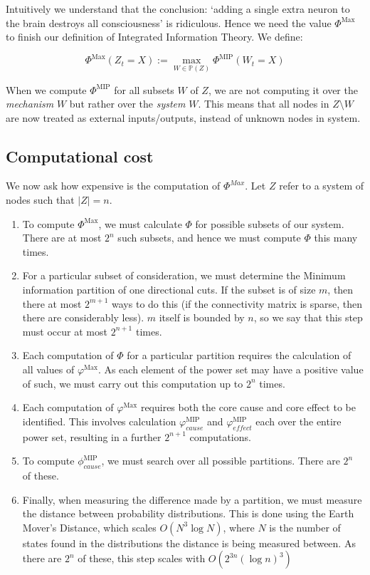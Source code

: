 Intuitively we understand that the conclusion: `adding a single extra neuron to the brain destroys all consciousness' is ridiculous. Hence we need the value $\Phi^{\text{Max}}$ to finish our definition of Integrated Information Theory. We define:

\begin{equation}
\label{def:Phimax}
\Phi^{\text{Max}}(Z_t = X) := \max \limits_{W \in \mathbb{P}(Z)}\Phi^{\text{MIP}} (W_t = X)
\end{equation}

\begin{remark}
	When we compute $\Phi^{\text{MIP}} $ for all subsets $W$ of $Z$, we are not computing it over the \textit{mechanism} $W$ but rather over the \textit{system} $W$. This means that all nodes in $Z \setminus W$ are now treated as external inputs/outputs, instead of unknown nodes in system.
\end{remark}

\subsection{Computational cost}
We now ask how expensive is the computation of $\Phi^{Max}$. Let $Z$ refer to a system of nodes such that $|Z| = n$.

\begin{enumerate}
	\item To compute $\Phi^{\text{Max}}$, we must calculate $\Phi$ for possible subsets of our system. There are at most $2^n$ such subsets, and hence we must compute $\Phi$ this many times.
	\item For a particular subset of consideration, we must determine the Minimum information partition of one directional cuts. If the subset is of size $m$, then there at most $2^{m+1}$ ways to do this (if the connectivity matrix is sparse, then there are considerably less). $m$ itself is bounded by $n$, so we say that this step must occur at most $2^{n+1}$ times.
	\item Each computation of $\Phi$ for a particular partition requires the calculation of all values of $\varphi^{\text{Max}}$. As each element of the power set may have a positive value of such, we must carry out this computation up to $2^n$ times.
	\item Each computation of $\varphi^{\text{Max}}$ requires both the core cause and core effect to be identified. This involves calculation $\varphi^{\text{MIP}}_{cause}$ and $\varphi^{\text{MIP}}_{effect}$ each over the entire power set, resulting in a further $2^{n+1}$ computations.  
	\item To compute $\phi_{cause}^{\text{MIP}}$, we must search over all possible partitions. There are $2^n$ of these.
	\item Finally, when measuring the difference made by a partition, we must measure the distance between probability distributions. This is done using the Earth Mover's Distance, which scales $O(N^3 \log N)$, where $N$ is the number of states found in the distributions the distance is being measured between. As there are $2^n$ of these, this step scales with $O(2^{3n} (\log n)^3)$
\end{enumerate}

